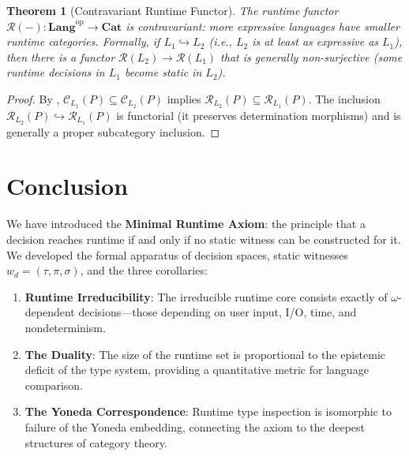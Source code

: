 \documentclass[11pt]{article}
\newtheorem{theorem}{Theorem}[section]
\newcommand{\witness}{w_d}
\newcommand{\Cat}{\mathbf{Cat}}
\begin{document}
\begin{theorem}[Contravariant Runtime Functor]
\label{thm:contravariant}
The runtime functor $\mathcal{R}(-) : \mathbf{Lang}^{\mathrm{op}} \to \Cat$ is
\emph{contravariant}: more expressive languages have smaller runtime categories.
Formally, if $L_1 \hookrightarrow L_2$ (i.e., $L_2$ is at least as expressive as
$L_1$), then there is a functor $\mathcal{R}(L_2) \to \mathcal{R}(L_1)$ that is
generally non-surjective (some runtime decisions in $L_1$ become static in $L_2$).
\end{theorem}

\begin{proof}
By , $\mathcal{C}_{L_1}(P) \subseteq \mathcal{C}_{L_2}(P)$
implies $\mathcal{R}_{L_2}(P) \subseteq \mathcal{R}_{L_1}(P)$. The inclusion
$\mathcal{R}_{L_2}(P) \hookrightarrow \mathcal{R}_{L_1}(P)$ is functorial (it
preserves determination morphisms) and is generally a proper subcategory inclusion.
\end{proof}


\section{Conclusion}
\label{sec:conclusion}

We have introduced the \textbf{Minimal Runtime Axiom}: the principle that a decision
reaches runtime if and only if no static witness can be constructed for it. We developed
the formal apparatus of decision spaces, static witnesses $\witness = (\tau, \pi, \sigma)$,
and the three corollaries:

\begin{enumerate}
  \item \textbf{Runtime Irreducibility}: The irreducible runtime core consists exactly of
    $\omega$-dependent decisions---those depending on user input, I/O, time, and
    nondeterminism.
  \item \textbf{The Duality}: The size of the runtime set is proportional to the
    epistemic deficit of the type system, providing a quantitative metric for language
    comparison.
  \item \textbf{The Yoneda Correspondence}: Runtime type inspection is isomorphic to
    failure of the Yoneda embedding, connecting the axiom to the deepest structures of
    category theory.
\end{enumerate}
\end{document}
